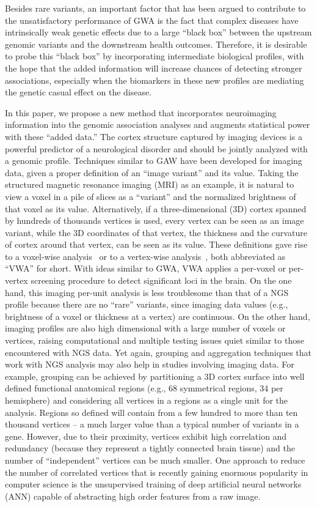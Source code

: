 \documentclass[11pt]{article}
\begin{document}
Besides rare variants, an important factor that has been argued to contribute to the unsatisfactory performance of GWA is the fact that complex diseases have intrinsically weak genetic effects due to a large ``black box'' between the upstream genomic variants and the downstream health outcomes. Therefore, it is desirable to probe this ``black box'' by incorporating intermediate biological profiles, with the hope that the added information will increase chances of detecting stronger associations, especially when the biomarkers in these new profiles are mediating the genetic casual effect on the disease. 

In this paper, we propose a new method that incorporates neuroimaging information into the genomic association analyses and augments statistical power with these ``added data.'' The cortex structure captured by imaging devices is a powerful predictor of a neurological disorder and should be jointly analyzed with a genomic profile. Techniques similar to GAW have been developed for imaging data, given a proper definition of an ``image variant'' and its value. Taking the structured magnetic resonance imaging (MRI) as an example, it is natural to view a voxel in a pile of slices as a ``variant'' and the normalized brightness of that voxel as its value. Alternatively, if a three-dimensional (3D) cortex spanned by hundreds of thousands vertices is used, every vertex can be seen as an image variant, while the 3D coordinates of that vertex, the thickness and the curvature of cortex around that vertex, can be seen as its value. These definitions gave rise to a voxel-wise analysis~\citep{VWA1, VWA2, VWA3, VWA4} or to a vertex-wise analysis~\citep{FS:Anl1, FS:Anl2}, both abbreviated as ``VWA'' for short. With ideas similar to GWA, VWA applies a per-voxel or per-vertex screening procedure to detect significant loci in the brain. On the one hand, this imaging per-unit analysis is less troublesome than that of a NGS profile because there are no ``rare'' variants, since imaging data values (e.g., brightness of a voxel or thickness at a vertex) are continuous. On the other hand, imaging profiles are also high dimensional with a large number of voxels or vertices, raising computational and multiple testing issues quiet similar to those encountered with NGS data. Yet again, grouping and aggregation techniques that work with NGS analysis may also help in studies involving imaging data. For example, grouping can be achieved by partitioning a 3D cortex surface into well defined functional anatomical regions (e.g., 68 symmetrical regions, 34 per hemisphere) and considering all vertices in a regions as a single unit for the analysis. Regions so defined will contain from a few hundred to more than ten thousand vertices -- a much larger value than a typical number of variants in a gene. However, due to their proximity, vertices exhibit high correlation and redundancy (because they represent a tightly connected brain tissue) and the number of ``independent'' vertices can be much smaller. One approach to reduce the number of correlated vertices that is recently gaining enormous popularity in computer science is the unsupervised training of deep artificial neural networks (ANN) capable of abstracting high order features from a raw image. 
\end{document}
